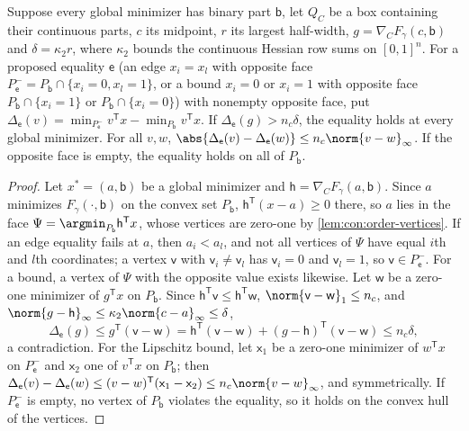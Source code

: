 \begin{lemma}\label{lem:con:lpgap}
Suppose every global minimizer has binary part $\mathsf b$, let $Q_C$ be a box
containing their continuous parts, $c$ its midpoint, $r$ its largest
half-width, $g=\nabla_CF_\gamma(c,\mathsf b)$ and $\delta=\kappa_2r$, where
$\kappa_2$ bounds the continuous Hessian row sums on $[0,1]^n$. For a proposed
equality $\mathsf e$ (an edge $x_i=x_l$ with opposite face
$P_{\mathsf e}^-=P_{\mathsf b}\cap\{x_i=0,x_l=1\}$, or a bound $x_i=0$ or $x_i=1$
with opposite face $P_{\mathsf b}\cap\{x_i=1\}$ or $P_{\mathsf b}\cap\{x_i=0\}$)
with nonempty opposite face, put
$\Delta_{\mathsf e}(v)=\min_{P_{\mathsf e}^-}v^{\mathsf T}x-\min_{P_{\mathsf b}}v^{\mathsf T}x$.
If $\Delta_{\mathsf e}(g)>n_c\delta$, the equality holds at every global
minimizer. For all $v,w$, $\abs{\Delta_{\mathsf e}(v)-\Delta_{\mathsf e}(w)}\le
n_c\norm{v-w}_\infty$. If the opposite face is empty, the equality holds on all
of $P_{\mathsf b}$.
\end{lemma}

\begin{proof}
Let $x^*=(a,\mathsf b)$ be a global minimizer and $\mathsf h=\nabla_CF_\gamma(a,\mathsf
b)$. Since $a$ minimizes $F_\gamma(\cdot,\mathsf b)$ on the convex set
$P_{\mathsf b}$, $\mathsf h^{\mathsf T}(x-a)\ge0$ there, so $a$ lies in the face
$\Psi=\argmin_{P_{\mathsf b}}\mathsf h^{\mathsf T}x$, whose vertices are zero-one
by \cref{lem:con:order-vertices}. If an edge equality fails at $a$, then
$a_i<a_l$, and not all vertices of $\Psi$ have equal $i$th and $l$th
coordinates; a vertex $\mathsf v$ with $\mathsf v_i\ne\mathsf v_l$ has
$\mathsf v_i=0$ and $\mathsf v_l=1$, so $\mathsf v\in P_{\mathsf e}^-$. For a
bound, a vertex of $\Psi$ with the opposite value exists likewise. Let
$\mathsf w$ be a zero-one minimizer of $g^{\mathsf T}x$ on $P_{\mathsf b}$. Since
$\mathsf h^{\mathsf T}\mathsf v\le\mathsf h^{\mathsf T}\mathsf w$,
$\norm{\mathsf v-\mathsf w}_1\le n_c$, and $\norm{g-\mathsf h}_\infty\le\kappa_2
\norm{c-a}_\infty\le\delta$,
\[
 \Delta_{\mathsf e}(g)\le g^{\mathsf T}(\mathsf v-\mathsf w)
 =\mathsf h^{\mathsf T}(\mathsf v-\mathsf w)+(g-\mathsf h)^{\mathsf T}(\mathsf v-\mathsf w)
 \le n_c\delta ,
\]
a contradiction. For the Lipschitz bound, let $\mathsf x_1$ be a zero-one
minimizer of $w^{\mathsf T}x$ on $P_{\mathsf e}^-$ and $\mathsf x_2$ one of
$v^{\mathsf T}x$ on $P_{\mathsf b}$; then
$\Delta_{\mathsf e}(v)-\Delta_{\mathsf e}(w)\le(v-w)^{\mathsf T}(\mathsf x_1-\mathsf
x_2)\le n_c\norm{v-w}_\infty$, and symmetrically. If $P_{\mathsf e}^-$ is empty,
no vertex of $P_{\mathsf b}$ violates the equality, so it holds on the convex
hull of the vertices.
\end{proof}

